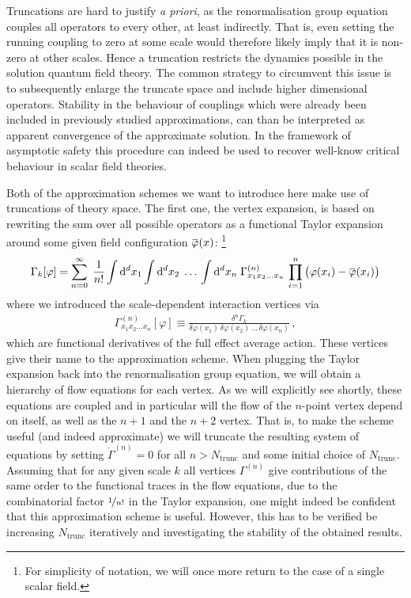 \documentclass[11pt]{book}
\newcommand{\overbar}[1]{\mkern 1.5mu\overline{\mkern-1.5mu#1\mkern-1.5mu}\mkern 1.5mu}
\newcommand\Ntrunc{ N_{\scriptscriptstyle{\mathrm{trunc}}} }
\newcommand{\bp}{\overbar \varphi}
\numberwithin{equation}{chapter}
\begin{document}
Truncations are hard to justify \textit{a priori}, as the renormalisation
group equation couples all operators to every other, at least indirectly.
That is, even setting the running coupling to zero at some scale would
therefore likely imply that it is non-zero at other scales.
Hence a truncation restricts the dynamics possible in the solution quantum
field theory. The common strategy to circumvent this issue is to
subsequently enlarge the truncate space and include higher dimensional operators.
Stability in the behaviour of couplings which were already been included
in previously studied approximations, can than be interpreted as apparent
convergence of the approximate solution. In the framework of asymptotic
safety this procedure can indeed be used to recover well-know
critical behaviour in scalar field theories.

Both of the approximation schemes we want to introduce here make use
of truncations of theory space. The first one, the vertex expansion,
is based on rewriting the sum over all possible operators as a
functional Taylor expansion around some given field configuration
$\bp(x)$:%
\footnote{%
  For simplicity of notation, we will once more return to the
  case of a single scalar field.
}
\begin{align}
  \Gamma_k [\varphi] =
  \sum_{n=0}^{\infty} \; \frac{1}{n!}
  \int \mathrm d^dx_1
  \int \mathrm d^dx_2
  \; \dots \,
  \int \mathrm d^dx_n \;
  \Gamma_{x_1 x_2 \dots x_n}^{(n)} \,
  \prod_{i=1}^n
  \big( \varphi(x_i) - \bp(x_i) \big)
\end{align}
where we introduced the scale-dependent interaction vertices via
\begin{align}
  \Gamma_{x_1 x_2 \dots x_n}^{(n)}[\varphi] \equiv
  \frac{\delta^n\Gamma_k}{\delta\varphi(x_1) \, \delta\varphi(x_2) \, \dots \, \delta\varphi(x_n)} \,,
\end{align}
which are functional derivatives of the full effect average action. These
vertices give their name to the approximation scheme. When plugging the
Taylor expansion back into the renormalisation group equation, we will
obtain a hierarchy of flow equations for each vertex. As we will explicitly
see shortly, these equations are coupled and in particular will the flow of
the $n$-point vertex depend on itself, as well as the $n+1$ and the $n+2$
vertex. That is, to make the scheme useful (and indeed approximate)
we will truncate the resulting system of equations by setting
$\dot \Gamma^{(n)} = 0$ for all $n>\Ntrunc$ and some initial choice of $\Ntrunc$.
Assuming that for any given scale $k$ all vertices $\Gamma^{(n)}$ give
contributions of the same order to the functional traces in the flow equations,
due to the combinatorial factor $\nicefrac{1}{n!}$ in the Taylor expansion,
one might indeed be confident that this approximation scheme is useful.
However, this has to be verified be increasing $\Ntrunc$ iteratively
and investigating the stability of the obtained results.
\end{document}
